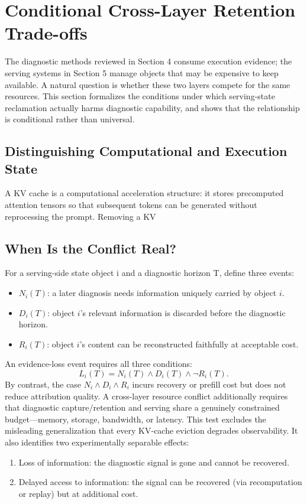 \documentclass[preprint,12pt]{elsarticle}
\begin{document}
\section{Conditional Cross-Layer Retention Trade-offs}\label{sec:retention}
The diagnostic methods reviewed in Section 4 consume execution evidence; the serving systems in Section 5 manage objects that may be expensive to keep available. A natural question is whether these two layers compete for the same resources. This section formalizes the conditions under which serving-state reclamation actually harms diagnostic capability, and shows that the relationship is conditional rather than universal.


\subsection{Distinguishing Computational and Execution State}
A KV cache is a computational acceleration structure: it stores precomputed attention tensors so that subsequent tokens can be generated without reprocessing the prompt. Removing a KV


\subsection{When Is the Conflict Real?}
For a serving-side state object i and a diagnostic horizon T, define three events:


\begin{itemize}
\item $N_i(T)$: a later diagnosis needs information uniquely carried by object $i$.
\item $D_i(T)$: object $i$'s relevant information is discarded before the diagnostic horizon.
\item $R_i(T)$: object $i$'s content can be reconstructed faithfully at acceptable cost.
\end{itemize}
An evidence-loss event requires all three conditions:
\begin{equation}\label{eq:v5_evidence_loss}
L_i(T) = N_i(T) \land D_i(T) \land \neg R_i(T).
\end{equation}
By contrast, the case $N_i \land D_i \land R_i$ incurs recovery or prefill cost
but does not reduce attribution quality. A cross-layer resource conflict
additionally requires that diagnostic capture/retention and serving share a
genuinely constrained budget---memory, storage, bandwidth, or latency.
This test excludes the misleading generalization that every KV-cache eviction
degrades observability. It also identifies two experimentally separable effects:
\begin{enumerate}
\item Loss of information: the diagnostic signal is gone and cannot be recovered.
\item Delayed access to information: the signal can be recovered (via recomputation
or replay) but at additional cost.
\end{enumerate}
\end{document}
